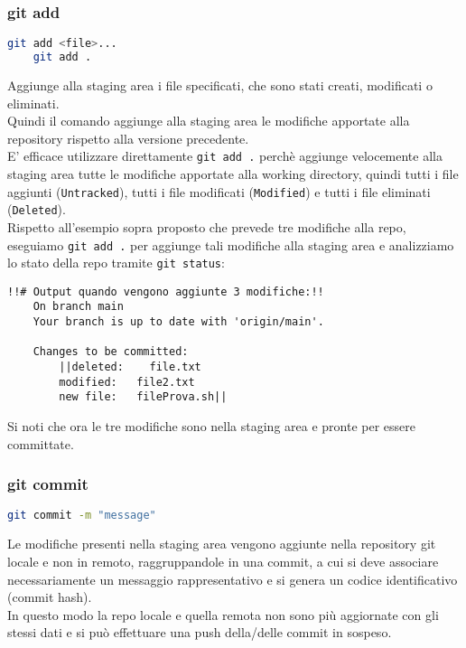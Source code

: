 \subsubsection{git add}
\begin{lstlisting}[language=bash]
	git add <file>...
	git add .
\end{lstlisting}
Aggiunge alla staging area i file specificati, che sono stati creati, modificati o eliminati.\\
Quindi il comando aggiunge alla staging area le modifiche apportate alla repository rispetto alla versione precedente.\\
E' efficace utilizzare direttamente \texttt{git add .} perchè aggiunge velocemente alla staging area tutte le modifiche apportate alla working directory, quindi tutti i file aggiunti (\texttt{Untracked}), tutti i file modificati (\texttt{Modified}) e tutti i file eliminati (\texttt{Deleted}).\vspace{.3cm}\\
Rispetto all'esempio sopra proposto che prevede tre modifiche alla repo, eseguiamo \texttt{git add .} per aggiunge tali modifiche alla staging area e analizziamo lo stato della repo tramite \texttt{git status}:
\begin{lstlisting}[backgroundcolor=\color{green!5}]
	!!# Output quando vengono aggiunte 3 modifiche:!!
	On branch main
	Your branch is up to date with 'origin/main'.      
	
	Changes to be committed:
		||deleted:    file.txt
		modified:   file2.txt
		new file:   fileProva.sh||
\end{lstlisting}
Si noti che ora le tre modifiche sono nella staging area e pronte per essere committate.

\newpage
\subsubsection{git commit}
\begin{lstlisting}[language=bash]
	git commit -m "message"
\end{lstlisting}
Le modifiche presenti nella staging area vengono aggiunte nella repository git locale e non in remoto, raggruppandole in una commit, a cui si deve associare necessariamente un messaggio rappresentativo e si genera un codice identificativo (commit hash).\\
In questo modo la repo locale e quella remota non sono più aggiornate con gli stessi dati e si può effettuare una push della/delle commit in sospeso.\\

